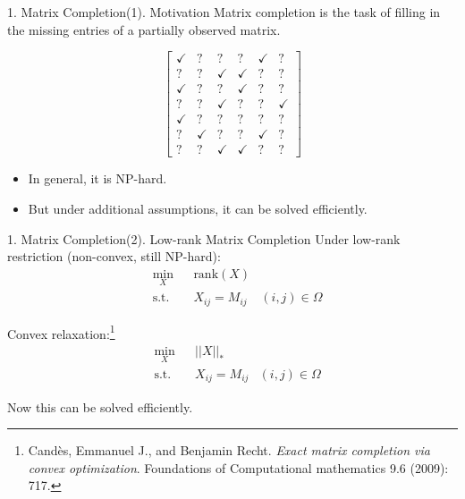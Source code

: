 \documentclass[professionalfonts]{beamer}
\begin{document}
\begin{frame}{1. Matrix Completion}{(1). Motivation}
Matrix completion is the task of filling in the missing entries of a partially observed matrix.

\begin{equation*}
\left[\begin{array}{llllll}
 {\checkmark} & {?} & {?} & {?} & {\checkmark} & {?} \\
 {?} & {?} & {\checkmark} & {\checkmark} & {?} & {?} \\
 {\checkmark} & {?} & {?} & {\checkmark} & {?} & {?} \\ 
 {?} & {?} & {\checkmark} & {?} & {?} & {\checkmark} \\ 
 {\checkmark} & {?} & {?} & {?} & {?} & {?} \\ 
 {?} & {\checkmark} & {?} & {?} & {\checkmark} & {?} \\ 
 {?} & {?} & {\checkmark} & {\checkmark} & {?} & {?}
 \end{array}\right]
\end{equation*}

\begin{itemize}
\item In general, it is NP-hard.
\item But under additional assumptions, it can be solved efficiently.
\end{itemize}
\end{frame}

\begin{frame}{1. Matrix Completion}{(2). Low-rank Matrix Completion}
Under low-rank restriction (non-convex, still NP-hard):
\begin{equation*}
    \begin{aligned}
    & \underset{X}{\text{min}}
    & & \text{rank}(X) &  \\
    & \text{s.t.} & &  X_{ij} = M_{ij}  & (i,j) \in \Omega
    \end{aligned}
\end{equation*} 

Convex relaxation:\footnote{Candès, Emmanuel J., and Benjamin Recht. \textit{Exact matrix completion via convex optimization}. Foundations of Computational mathematics 9.6 (2009): 717.}
\begin{equation*}
    \begin{aligned}
    & \underset{X}{\text{min}}
    & & ||X||_* &  \\
    & \text{s.t.} & &  X_{ij} = M_{ij}  & (i,j) \in \Omega
    \end{aligned}
\end{equation*} 

Now this can be solved efficiently.
\end{frame}
\end{document}
